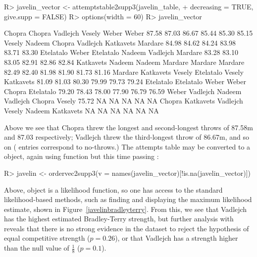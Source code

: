 \documentclass[article]{jss}
\begin{document}
\begin{Schunk}
\begin{Sinput}
R> javelin_vector <- attemptstable2supp3(javelin_table,
+        decreasing = TRUE, give.supp = FALSE)
R> options(width = 60)
R> javelin_vector
\end{Sinput}
\begin{Soutput}
   Chopra    Chopra  Vadlejch    Vesely     Weber     Weber 
    87.58     87.03     86.67     85.44     85.30     85.15 
   Vesely    Nadeem    Chopra  Vadlejch Katkavets   Mardare 
    84.98     84.62     84.24     83.98     83.71     83.30 
Etelatalo     Weber Etelatalo    Nadeem  Vadlejch   Mardare 
    83.28     83.10     83.05     82.91     82.86     82.84 
Katkavets    Nadeem    Nadeem   Mardare   Mardare   Mardare 
    82.49     82.40     81.98     81.90     81.73     81.16 
  Mardare Katkavets    Vesely Etelatalo    Vesely Katkavets 
    81.09     81.03     80.30     79.99     79.73     79.24 
Etelatalo Etelatalo     Weber     Weber    Chopra Etelatalo 
    79.20     78.43     78.00     77.90     76.79     76.59 
    Weber  Vadlejch    Nadeem  Vadlejch    Chopra    Vesely 
    75.72        NA        NA        NA        NA        NA 
   Chopra Katkavets  Vadlejch    Vesely    Nadeem Katkavets 
       NA        NA        NA        NA        NA        NA 
\end{Soutput}
\end{Schunk}

Above we see that Chopra threw the longest and second-longest throws
of 87.58m and 87.03 respectively; Vadlejch threw the third-longest
throw of 86.67m, and so on ( entries correspond to
no-throws.)  The attempts table may be converted to a 
object, again using function  but this
time passing :

\begin{Schunk}
\begin{Sinput}
R> javelin <- ordervec2supp3(v = names(javelin_vector)[!is.na(javelin_vector)])
\end{Sinput}
\end{Schunk}

Above, object  is a  likelihood function,
so one has access to the standard likelihood-based methods, such as
finding and displaying the maximum likelihood estimate, shown in
Figure~\ref{javelinbradleyterry}.  From this, we see that Vadlejch has
the highest estimated Bradley-Terry strength, but further analysis
with  reveals that there is no strong evidence in
the dataset to reject the hypothesis of equal competitive strength
($p=0.26$), or that Vadlejch has a strength higher than the null value
of $\frac{1}{8}$ ($p=0.1$).
\end{document}
